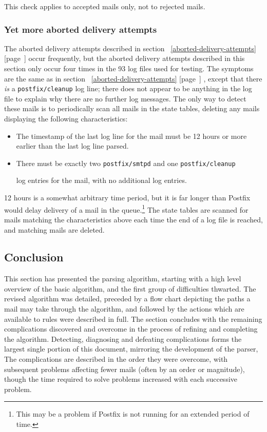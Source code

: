 \documentclass[a4paper,12pt,draft]{article}
\newcommand{\refwithpage}[1]{%
    \empty{}\ref{#1} [page~\pageref{#1}]%
}
\newcommand{\daemon}[1]{%
    \texttt{postfix/#1}%
}
\begin{document}
This check applies to accepted mails only, not to rejected mails.

\subsubsection{Yet more aborted delivery attempts}

\label{yet-more-aborted-delivery-attempts}

The aborted delivery attempts described in
section~\refwithpage{aborted-delivery-attempts} occur frequently, but the
aborted delivery attempts described in this section only occur four times
in the 93 log files used for testing.  The symptoms are the same as in
section~\refwithpage{aborted-delivery-attempts}, except that there
\textit{is\/} a \daemon{cleanup} log line; there does not appear to be
anything in the log file to explain why there are no further log messages.
The only way to detect these mails is to periodically scan all mails in the
state tables, deleting any mails displaying the following characteristics:

\begin{itemize}

    \item The timestamp of the last log line for the mail must be 12 hours
        or more earlier than the last log line parsed.

    \item There must be exactly two \daemon{smtpd} and one \daemon{cleanup}
        log entries for the mail, with no additional log entries.

\end{itemize}

12 hours is a somewhat arbitrary time period, but it is far longer than
Postfix would delay delivery of a mail in the queue.\footnote{This may be a
problem if Postfix is not running for an extended period of time.}  The
state tables are scanned for mails matching the characteristics above each
time the end of a log file is reached, and matching mails are deleted.

\subsection{Conclusion}

This section has presented the parsing algorithm, starting with a high
level overview of the basic algorithm, and the first group of difficulties
thwarted.  The revised algorithm was detailed, preceded by a flow chart
depicting the paths a mail may take through the algorithm, and followed by
the actions which are available to rules were described in full.  The
section concludes with the remaining complications discovered and overcome
in the process of refining and completing the algorithm.  Detecting,
diagnosing and defeating complications forms the largest single portion of
this document, mirroring the development of the parser,  The complications
are described in the order they were overcome, with subsequent problems
affecting fewer mails (often by an order or magnitude), though the time
required to solve problems increased with each successive problem.
\end{document}

